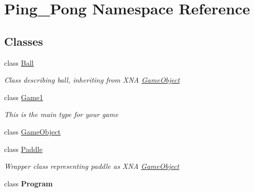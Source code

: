 \hypertarget{namespace_ping___pong}{}\section{Ping\+\_\+\+Pong Namespace Reference}
\label{namespace_ping___pong}
\subsection*{Classes}
\begin{DoxyCompactItemize}
\item 
class \hyperlink{class_ping___pong_1_1_ball}{Ball}
\begin{DoxyCompactList}\small\item\em Class describing ball, inheriting from X\+NA \hyperlink{class_ping___pong_1_1_game_object}{Game\+Object} \end{DoxyCompactList}\item 
class \hyperlink{class_ping___pong_1_1_game1}{Game1}
\begin{DoxyCompactList}\small\item\em This is the main type for your game \end{DoxyCompactList}\item 
class \hyperlink{class_ping___pong_1_1_game_object}{Game\+Object}
\item 
class \hyperlink{class_ping___pong_1_1_paddle}{Paddle}
\begin{DoxyCompactList}\small\item\em Wrapper class representing paddle as X\+NA \hyperlink{class_ping___pong_1_1_game_object}{Game\+Object} \end{DoxyCompactList}\item 
class {\bfseries Program}
\end{DoxyCompactItemize}
